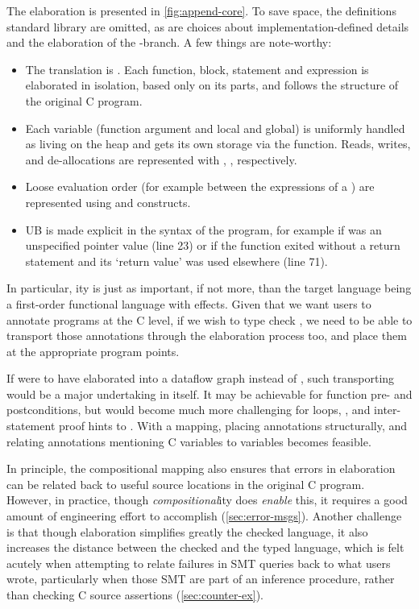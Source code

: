 The elaboration is presented in \cref{fig:append-core}. To save space,
the definitions  standard library are omitted, as are choices about
implementation-defined details and the elaboration of the
-branch. A few things are note-worthy:
\begin{itemize}
    \item The translation is . Each function, block,
        statement and expression is elaborated in isolation, based only
        on its parts, and follows the structure of the original C program.
    \item Each variable (function argument and local and global) is uniformly
        handled as living on the heap and gets its own storage via the
         function. Reads, writes, and de-allocations are
        represented with , ,
         respectively.
    \item Loose evaluation order (for example between the expressions of a \cinline{==})
        are represented using  and  constructs.
    \item UB is made explicit in the syntax of the program, for example if  was
        an unspecified pointer value (line 23) or if the function exited without a return statement
        and its `return value' was used elsewhere (line 71).
\end{itemize}

In particular, ity is just as important, if not more, than the
target language being a first-order functional language with effects. Given
that we want users to annotate programs at the C level, if we wish to type
check , we need to be able to transport those annotations through the
elaboration process too, and place them at the appropriate program points.

If  were to have elaborated into a dataflow graph instead of ,
such transporting would be a major undertaking in itself. It may be achievable
for function pre- and postconditions, but would become much more challenging
for loops, , and inter-statement proof
hints to . With a  mapping, placing annotations
structurally, and relating annotations mentioning C variables to 
variables becomes feasible.

In principle, the compositional mapping also ensures that errors in 
elaboration can be related back to useful source locations in the original C
program. However, in practice, though \emph{compositional}ity does
\emph{enable} this, it requires a good amount of engineering effort to
accomplish (\cref{sec:error-msgs}). Another challenge is that though
elaboration simplifies greatly the checked language, it also increases the
distance between the checked and the typed language, which is felt acutely when
attempting to relate failures in SMT queries back to what users wrote,
particularly when those SMT are part of an inference procedure, rather
than checking C source assertions (\cref{sec:counter-ex}).

